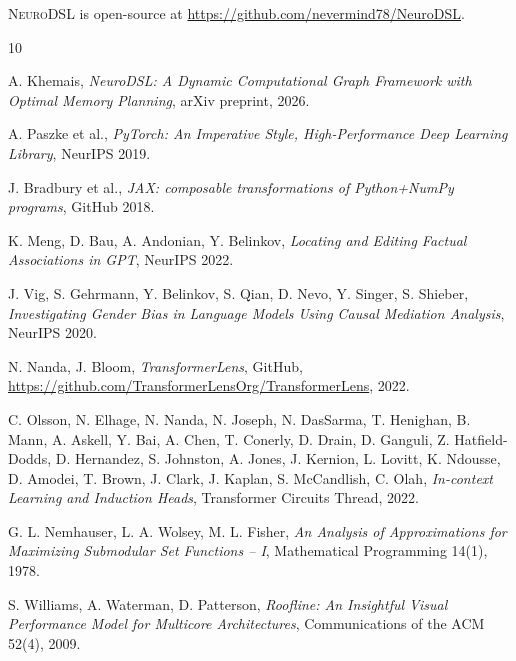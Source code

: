 \documentclass{article}
\begin{document}
\textsc{NeuroDSL} is open-source at \url{https://github.com/nevermind78/NeuroDSL}.

\begin{thebibliography}{10}

A. Khemais, \textit{NeuroDSL: A Dynamic Computational Graph Framework with Optimal Memory
Planning}, arXiv preprint, 2026.

A. Paszke et al., \textit{PyTorch: An Imperative Style, High-Performance Deep Learning Library},
NeurIPS 2019.

J. Bradbury et al., \textit{JAX: composable transformations of Python+NumPy programs}, GitHub
2018.

K. Meng, D. Bau, A. Andonian, Y. Belinkov, \textit{Locating and Editing Factual Associations in
GPT}, NeurIPS 2022.

J. Vig, S. Gehrmann, Y. Belinkov, S. Qian, D. Nevo, Y. Singer, S. Shieber, \textit{Investigating
Gender Bias in Language Models Using Causal Mediation Analysis}, NeurIPS 2020.

N. Nanda, J. Bloom, \textit{TransformerLens}, GitHub, \url{https://github.com/TransformerLensOrg/TransformerLens}, 2022.

C. Olsson, N. Elhage, N. Nanda, N. Joseph, N. DasSarma, T. Henighan, B. Mann, A. Askell,
Y. Bai, A. Chen, T. Conerly, D. Drain, D. Ganguli, Z. Hatfield-Dodds, D. Hernandez, S. Johnston,
A. Jones, J. Kernion, L. Lovitt, K. Ndousse, D. Amodei, T. Brown, J. Clark, J. Kaplan,
S. McCandlish, C. Olah, \textit{In-context Learning and Induction Heads}, Transformer Circuits
Thread, 2022.

G. L. Nemhauser, L. A. Wolsey, M. L. Fisher, \textit{An Analysis of Approximations for
Maximizing Submodular Set Functions -- I}, Mathematical Programming 14(1), 1978.

S. Williams, A. Waterman, D. Patterson, \textit{Roofline: An Insightful Visual Performance Model
for Multicore Architectures}, Communications of the ACM 52(4), 2009.

\end{thebibliography}
\end{document}

